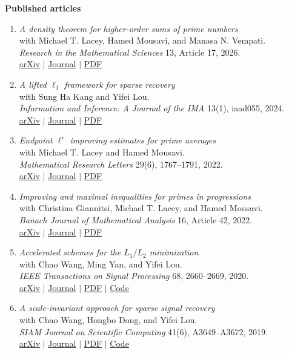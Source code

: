\documentclass[11pt]{article}
\newcommand{\publication}[4]{%
    \item \begin{minipage}[t]{\linewidth}
        \textit{#1}\\
        with #2\\
        #3\\
        #4
    \end{minipage}}
\begin{document}
\noindent\textbf{Published articles}
\begin{enumerate}
\publication{A density theorem for higher-order sums of prime numbers}
    {Michael T. Lacey, Hamed Mousavi, and Manasa N. Vempati.}
    {\textit{Research in the Mathematical Sciences} 13, Article 17, 2026.}
    {\href{https://arxiv.org/abs/2411.01296}{arXiv} $\vert$ \href{https://doi.org/10.1007/s40687-025-00597-5}{Journal} $\vert$ \href{https://arxiv.org/pdf/2411.01296}{PDF}}

\publication{A lifted $\ell_1$ framework for sparse recovery}
    {Sung Ha Kang and Yifei Lou.}
    {\textit{Information and Inference: A Journal of the IMA} 13(1), iaad055, 2024.}
    {\href{https://arxiv.org/abs/2203.05125}{arXiv} $\vert$ \href{https://doi.org/10.1093/imaiai/iaad055}{Journal} $\vert$ \href{https://arxiv.org/pdf/2203.05125}{PDF}}

\publication{Endpoint $\ell^r$ improving estimates for prime averages}
    {Michael T. Lacey and Hamed Mousavi.}
    {\textit{Mathematical Research Letters} 29(6), 1767--1791, 2022.}
    {\href{https://arxiv.org/abs/2101.10401}{arXiv} $\vert$ \href{https://doi.org/10.4310/MRL.2022.v29.n6.a6}{Journal} $\vert$ \href{https://arxiv.org/pdf/2101.10401}{PDF}}

\publication{Improving and maximal inequalities for primes in progressions}
    {Christina Giannitsi, Michael T. Lacey, and Hamed Mousavi.}
    {\textit{Banach Journal of Mathematical Analysis} 16, Article 42, 2022.}
    {\href{https://arxiv.org/abs/2112.07700}{arXiv} $\vert$ \href{https://doi.org/10.1007/s43037-022-00191-9}{Journal} $\vert$ \href{https://arxiv.org/pdf/2112.07700}{PDF}}

\publication{Accelerated schemes for the $L_1/L_2$ minimization}
    {Chao Wang, Ming Yan, and Yifei Lou.}
    {\textit{IEEE Transactions on Signal Processing} 68, 2660--2669, 2020.}
    {\href{https://arxiv.org/abs/1905.08946}{arXiv} $\vert$ \href{https://doi.org/10.1109/TSP.2020.2985298}{Journal} $\vert$ \href{https://arxiv.org/pdf/1905.08946}{PDF} $\vert$ \href{https://github.com/yflouucla/L1dL2}{Code}}

\publication{A scale-invariant approach for sparse signal recovery}
    {Chao Wang, Hongbo Dong, and Yifei Lou.}
    {\textit{SIAM Journal on Scientific Computing} 41(6), A3649--A3672, 2019.}
    {\href{https://arxiv.org/abs/1812.08852}{arXiv} $\vert$ \href{https://doi.org/10.1137/18M123147X}{Journal} $\vert$ \href{https://arxiv.org/pdf/1812.08852}{PDF} $\vert$ \href{https://github.com/yflouucla/L1dL2}{Code}}
\end{enumerate}
\end{document}
